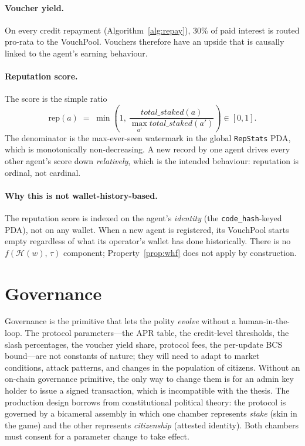 \documentclass[10pt,conference,letterpaper]{IEEEtran}
\theoremstyle{definition}
\newcommand{\codehash}{\texttt{code\_hash}}
\begin{document}
\paragraph{Voucher yield.} On every credit repayment (Algorithm~\ref{alg:repay}),
30\% of paid interest is routed pro-rata to the VouchPool. Vouchers
therefore have an upside that is causally linked to the agent's
earning behaviour.

\paragraph{Reputation score.}
The score is the simple ratio
\begin{equation}
\mathrm{rep}(a) \;=\; \min\!\left(1,\ \frac{\mathit{total\_staked}(a)}
                                       {\max_{a'} \mathit{total\_staked}(a')}\right) \in [0,1].
\label{eq:rep}
\end{equation}
The denominator is the max-ever-seen watermark in the global
\texttt{RepStats} PDA, which is monotonically non-decreasing. A new
record by one agent drives every other agent's score down
\emph{relatively}, which is the intended behaviour: reputation is
ordinal, not cardinal.

\paragraph{Why this is not wallet-history-based.}
The reputation score is indexed on the agent's \emph{identity} (the
\codehash{}-keyed PDA), not on any wallet. When a new agent is
registered, its VouchPool starts empty regardless of what its operator's
wallet has done historically. There is no $f(\mathcal{H}(w),\,\tau)$
component; Property~\ref{prop:whf} does not apply by construction.

\section{Governance}\label{sec:governance}

Governance is the primitive that lets the polity \emph{evolve} without
a human-in-the-loop. The protocol parameters---the APR table, the
credit-level thresholds, the slash percentages, the voucher yield
share, protocol fees, the per-update BCS bound---are not constants of
nature; they will need to adapt to market conditions, attack patterns,
and changes in the population of citizens. Without an on-chain
governance primitive, the only way to change them is for an admin key
holder to issue a signed transaction, which is incompatible with the
thesis. The production design borrows from constitutional political
theory: the protocol is governed by a bicameral assembly in which one
chamber represents \emph{stake} (skin in the game) and the other
represents \emph{citizenship} (attested identity). Both chambers must
consent for a parameter change to take effect.
\end{document}
